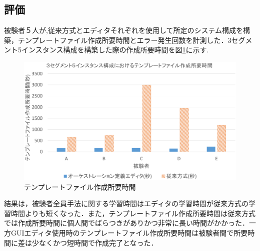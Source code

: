 \documentclass[a4j]{jarticle}
\begin{document}
\begin{Abstract}
 \section{評価}
 被験者５人が,従来方式とエディタそれぞれを使用して所定のシステム構成を構築，テンプレートファイル作成所要時間とエラー発生回数を計測した．3セグメント5インスタンス構成を構築した際の作成所要時間を図\ref{graf:2}に示す.
 \begin{figure}[H]
 	\begin{center}
 		\vspace{-3mm}
 		\includegraphics[scale=0.27]{Document/Abstract_Comparison.eps}
 		\caption{テンプレートファイル作成所要時間}
 		\label{graf:2}
 	\end{center}
 \end{figure}
 \vspace{-3mm}
 結果は，被験者全員手法に関する学習時間はエディタの学習時間が従来方式の学習時間よりも短くなった．また，テンプレートファイル作成所要時間は従来方式では作成所要時間に個人間でばらつきがありかつ非常に長い時間がかかった．一方GUIエディタ使用時のテンプレートファイル作成所要時間は被験者間で所要時間に差は少なくかつ短時間で作成完了となった．
 

\end{Abstract}
\end{document}
